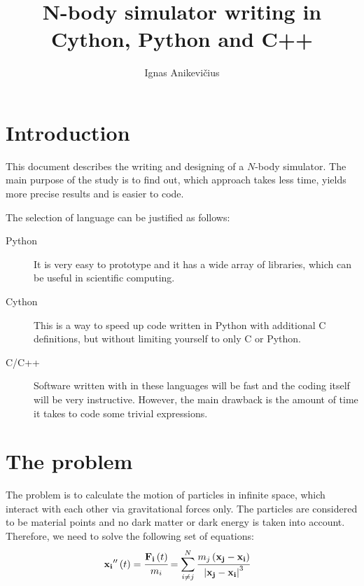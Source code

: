 \documentclass[
    draft,
    fontsize=11pt,
    DIV=calc
]{scrartcl}
\title{N-body simulator writing in Cython, Python and C++}
\author{Ignas Anikevičius}
\newcommand{\vect}[1]{\ensuremath{\mathrm{\mathbf{#1}}}}
\begin{document}
\maketitle

\begin{abstract}
\end{abstract}

\section{Introduction}

%
This document describes the writing and designing of a $N$-body simulator. 
%
The main purpose of the study is to find out, which approach takes less time, yields more precise results and is easier to code.

%
The selection of language can be justified as follows:
%
\begin{description}
    \item[Python] It is very easy to prototype and it has a wide array of libraries, which can be useful in scientific computing.
    \item[Cython] This is a way to speed up code written in Python with additional C definitions, but without limiting yourself to only C or Python.
    \item[C/C++] Software written with in these languages will be fast and the coding itself will be very instructive. However, the main drawback is the amount of time it takes to code some trivial expressions.
\end{description}

\section{The problem}

The problem is to calculate the motion of particles in infinite space, which interact with each other via gravitational forces only.
%
The particles are considered to be material points and no dark matter or dark energy is taken into account.
%
Therefore, we need to solve the following set of equations:
%
\begin{align}
    \vect{x_i}^{\prime\prime}\left(t\right)
    &=
    \cfrac{\vect{F_i}\left(t\right)}{m_i}
    =
    \sum_{i\ne j}^{N}{
        \cfrac{
            m_j 
            \left(
                \vect{x_j} - \vect{x_i}
            \right)
        }{
            \left|
                \vect{x_j} - \vect{x_i}
            \right|^3
        }
    }
    \label{eq:govern}
\end{align}
\end{document}
